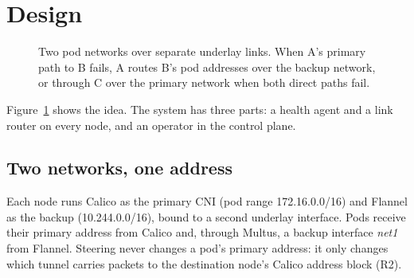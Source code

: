 \documentclass[conference,compsoc]{IEEEtran}
\begin{document}
\section{Design}
\label{sec:design}

\begin{figure}[t]
\centering
{}
\caption{Two pod networks over separate underlay links. When A's primary path to B
fails, A routes B's pod addresses over the backup network, or through C over the
primary network when both direct paths fail.}
\label{fig:arch}
\end{figure}

Figure~\ref{fig:arch} shows the idea. The system has three parts: a health agent and a
link router on every node, and an operator in the control plane.

\subsection{Two networks, one address}
Each node runs Calico as the primary CNI (pod range 172.16.0.0/16) and Flannel as the
backup (10.244.0.0/16), bound to a second underlay interface. Pods receive their
primary address from Calico and, through Multus, a backup interface \emph{net1} from
Flannel. Steering never changes a pod's primary address: it only changes which tunnel
carries packets to the destination node's Calico address block (R2).
\end{document}
